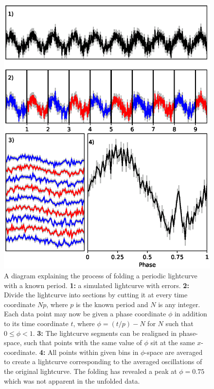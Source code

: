 \begin{figure}
    \includegraphics[width=\columnwidth, trim = 0mm 20mm 0mm 28mm]{images/folding.eps}
    \captionsetup{singlelinecheck=off}
    \caption{A diagram explaining the process of folding a periodic lightcurve with a known period.  \textbf{1:} a simulated lightcurve with errors.  \textbf{2:} Divide the lightcurve into sections by cutting it at every time coordinate $Np$, where $p$ is the known period and $N$ is any integer.  Each data point may now be given a phase coordinate $\phi$ in addition to its time coordinate $t$, where $\phi=(t/p)-N$ for $N$ such that $0\leq\phi<1$.  \textbf{3:} The lightcurve segments can be realigned in phase-space, such that points with the same value of $\phi$ sit at the same $x$-coordinate.  \textbf{4:} All points within given bins in $\phi$-space are averaged to create a lightcurve corresponding to the averaged oscillations of the original lightcurve.  The folding has revealed a peak at $\phi=0.75$ which was not apparent in the unfolded data.}
   \label{fig:Folding}
\end{figure}


